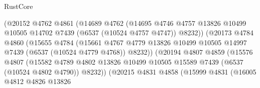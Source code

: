 \begin{lexlean}{RustCore}
\begin{coremodule}
                                  (@20152
                                    @4762
                                    @4861
                                    (@14689
                                      @4762
                                      (@14695
                                        @4746
                                        @4757
                                        @13826
                                        @10499
                                        @10505
                                        @14702
                                        @7439
                                        (@6537 (@10524 @4757 @4747))
                                        @8232))
                                    (@20173
                                      @4784
                                      @4860
                                      (@15655
                                        @4784
                                        (@15661
                                          @4767
                                          @4779
                                          @13826
                                          @10499
                                          @10505
                                          @14997
                                          @7439
                                          (@6537 (@10524 @4779 @4768))
                                          @8232))
                                      (@20194
                                        @4807
                                        @4859
                                        (@15576
                                          @4807
                                          (@15582
                                            @4789
                                            @4802
                                            @13826
                                            @10499
                                            @10505
                                            @15589
                                            @7439
                                            (@6537 (@10524 @4802 @4790))
                                            @8232))
                                        (@20215
                                          @4831
                                          @4858
                                          (@15999
                                            @4831
                                            (@16005
                                              @4812
                                              @4826
                                              @13826

\end{coremodule}
\end{lexlean}
